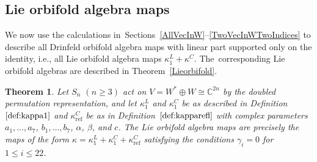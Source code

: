 \documentclass[pdftex]{sigma}
\numberwithin{equation}{section}
\newtheorem{Theorem}{Theorem}[section]
\DeclareMathOperator{\refl}{ref}
\begin{document}
\subsection{Lie orbifold algebra maps}

We now use the calculations in~Sections~\ref{AllVecInW}--\ref{TwoVecInWTwoIndices}
to describe all Drinfeld orbifold algebra maps with linear part
supported only on the identity, i.e., all Lie orbifold algebra maps
$\kappa^L_1+\kappa^C$. The~corresponding Lie orbifold algebras are
described in Theorem~\ref{Lieorbifold}.

\begin{Theorem}
\label{thm:LOAMapsDoubledPerm}
Let $S_n$ $(n \geq 3)$ act on $V=W^* \oplus W \cong \mathbb{C}^{2n}$ by the
doubled permutation representation, and let $\kappa^L_1$ and $\kappa^C_1$
be as described in Definition~$\ref{def:kappa1}$ and
$\kappa^C_{\refl}$ be as in Definition~$\ref{def:kapparefl}$ with
complex parameters $a_1,\dots,a_7$, $b_1,\dots,b_7$, $\alpha$, $\beta$, and $c$.
The Lie orbifold algebra maps are precisely the maps of the form
$\kappa=\kappa^L_1+\kappa^C_1+\kappa^C_{\refl}$ satisfying the
conditions $\gamma_i=0$ for $1 \leq i \leq 22$.
\end{Theorem}
\end{document}
